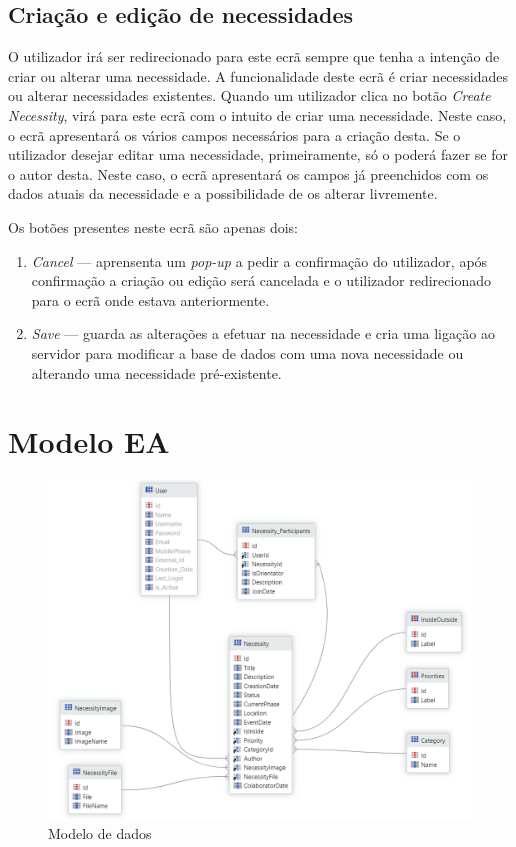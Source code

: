 \documentclass[a4paper,openright,11pt]{report}
\begin{document}
\subsection*{Criação e edição de necessidades}\label{sec:necessityCreation}

O utilizador irá ser redirecionado para este ecrã sempre que tenha a intenção de criar ou alterar uma necessidade.
A funcionalidade deste ecrã é criar necessidades ou alterar necessidades existentes.
Quando um utilizador clica no botão \textit{Create Necessity}, virá para este ecrã com o intuito de criar uma necessidade.
Neste caso, o ecrã apresentará os vários campos necessários para a criação desta.
Se o utilizador desejar editar uma necessidade, primeiramente, só o poderá fazer se for o autor desta.
Neste caso, o ecrã apresentará os campos já preenchidos com os dados atuais da necessidade e a possibilidade de os alterar livremente.

Os botões presentes neste ecrã são apenas dois:
\begin{enumerate}
    \item \textit{Cancel} --- aprensenta um \textit{pop-up} a pedir a confirmação do utilizador, após confirmação a criação ou edição será cancelada e o utilizador redirecionado para o ecrã onde estava anteriormente.
    \item \textit{Save} --- guarda as alterações a efetuar na necessidade e cria uma ligação ao servidor para modificar a base de dados com uma nova necessidade ou alterando uma necessidade pré-existente.
\end{enumerate}

\section*{Modelo EA}\label{sec:db}

\begin{figure}[H]
  \centering 
  \includegraphics[scale=0.4]{figures/DataModel.png}
  \caption{Modelo de dados}\label{fig:datamodel}
\end{figure}
\end{document}

